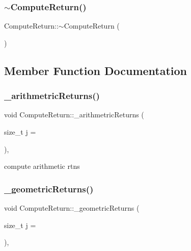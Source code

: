 \subsubsection{\texorpdfstring{$\sim$\+Compute\+Return()}{~ComputeReturn()}}
{\footnotesize\ttfamily Compute\+Return\+::$\sim$\+Compute\+Return (\begin{DoxyParamCaption}{ }\end{DoxyParamCaption})\hspace{0.3cm}{\ttfamily [inline]}}



\subsection{Member Function Documentation}
\hypertarget{classComputeReturn_a80678bbba59305a392d001260fb2d32b}{}\label{classComputeReturn_a80678bbba59305a392d001260fb2d32b} 
\subsubsection{\texorpdfstring{\+\_\+arithmetric\+Returns()}{\_arithmetricReturns()}}
{\footnotesize\ttfamily void Compute\+Return\+::\+\_\+arithmetric\+Returns (\begin{DoxyParamCaption}\item[{size\+\_\+t}]{j = {} }\end{DoxyParamCaption})\hspace{0.3cm}{\ttfamily [inline]}, {\ttfamily [protected]}}



compute arithmetic rtns 

\hypertarget{classComputeReturn_a9738eae9cbcbe4d75a86335d95adc758}{}\label{classComputeReturn_a9738eae9cbcbe4d75a86335d95adc758} 
\subsubsection{\texorpdfstring{\+\_\+geometric\+Returns()}{\_geometricReturns()}}
{\footnotesize\ttfamily void Compute\+Return\+::\+\_\+geometric\+Returns (\begin{DoxyParamCaption}\item[{size\+\_\+t}]{j = {} }\end{DoxyParamCaption})\hspace{0.3cm}{\ttfamily [inline]}, {\ttfamily [protected]}}



